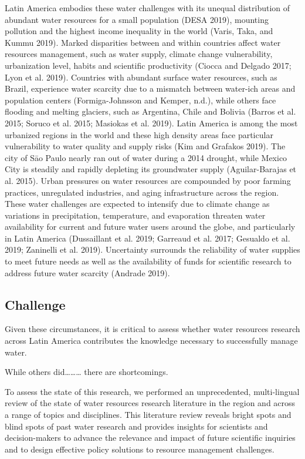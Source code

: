 \documentclass[]{article}
\begin{document}
Latin America embodies these water challenges with its unequal
distribution of abundant water resources for a small population (DESA
2019), mounting pollution and the highest income inequality in the world
(Varis, Taka, and Kummu 2019). Marked disparities between and within
countries affect water resources management, such as water supply,
climate change vulnerability, urbanization level, habits and scientific
productivity (Ciocca and Delgado 2017; Lyon et al. 2019). Countries with
abundant surface water resources, such as Brazil, experience water
scarcity due to a mismatch between water-ich areas and population
centers (Formiga-Johnsson and Kemper, n.d.), while others face flooding
and melting glaciers, such as Argentina, Chile and Bolivia (Barros et
al. 2015; Soruco et al. 2015; Masiokas et al. 2019). Latin America is
among the most urbanized regions in the world and these high density
areas face particular vulnerability to water quality and supply risks
(Kim and Grafakos 2019). The city of Sāo Paulo nearly ran out of water
during a 2014 drought, while Mexico City is steadily and rapidly
depleting its groundwater supply (Aguilar-Barajas et al. 2015). Urban
pressures on water resources are compounded by poor farming practices,
unregulated industries, and aging infrastructure across the region.
These water challenges are expected to intensify due to climate change
as variations in precipitation, temperature, and evaporation threaten
water availability for current and future water users around the globe,
and particularly in Latin America (Dussaillant et al. 2019; Garreaud et
al. 2017; Gesualdo et al. 2019; Zaninelli et al. 2019). Uncertainty
surrounds the reliability of water supplies to meet future needs as well
as the availability of funds for scientific research to address future
water scarcity (Andrade 2019).

\hypertarget{challenge}{%
\subsection{Challenge}\label{challenge}}

Given these circumstances, it is critical to assess whether water
resources research across Latin America contributes the knowledge
necessary to successfully manage water.

While others did\ldots\ldots\ldots{} there are shortcomings.

To assess the state of this research, we performed an unprecedented,
multi-lingual review of the state of water resources research literature
in the region and across a range of topics and disciplines. This
literature review reveals bright spots and blind spots of past water
research and provides insights for scientists and decision-makers to
advance the relevance and impact of future scientific inquiries and to
design effective policy solutions to resource management challenges.
\end{document}
